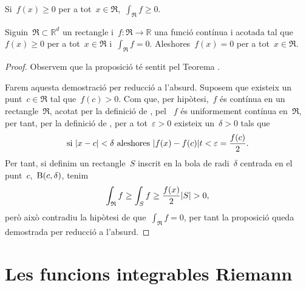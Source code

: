 \documentclass[../../main.tex]{subfiles}
\begin{document}
    \begin{corollary}
        Si~\(f(x)\geq0\) per a tot~\(x\in \mathfrak{R}\),~\(\int_{\mathfrak{R}}f\geq0\).
    \end{corollary}
    \begin{proposition}
        Siguin~\(\mathfrak{R}\subset\mathbb{R}^{d}\) un rectangle i~\(f\colon\mathfrak{R}\to\mathbb{R}\) una funció contínua i acotada tal que~\(f(x)\geq0\) per a tot~\(x\in \mathfrak{R}\) i~\(\int_{\mathfrak{R}}f=0\).
        Aleshores~\(f(x)=0\) per a tot~\(x\in \mathfrak{R}\).
        \begin{proof}
            Observem que la proposició té sentit pel Teorema .

            Farem aquesta demostració per reducció a l'absurd.
            Suposem que existeix un punt~\(c\in \mathfrak{R}\) tal que~\(f(c)>0\).
            Com que, per hipòtesi,~\(f\) és contínua en un rectangle~\(\mathfrak{R}\), acotat per la definició de , pel ~\(f\) és uniformement contínua en~\(\mathfrak{R}\), per tant, per la definició de , per a tot~\(\varepsilon>0\) existeix un~\(\delta>0\) tals que
            \[
                \text{si }\abs{x-c}<\delta\text{ aleshores }\abs{f(x)-f(c)}t<\varepsilon=\frac{f(c)}{2}.
            \]
            Per tant, si definim un rectangle~\(S\) inscrit en la bola de radi~\(\delta\) centrada en el punt~\(c\),~\(\operatorname{B}(c,\delta)\), tenim %
            \[
                \int_{\mathfrak{R}}f\geq\int_{S}f\geq\frac{f(x)}{2}\abs{S}>0,
            \]
            però això contradiu la hipòtesi de que~\(\int_{\mathfrak{R}}f=0\), per tant la proposició queda demostrada per reducció a l'absurd.
        \end{proof}
    \end{proposition}
\section{Les funcions integrables Riemann}
\end{document}
